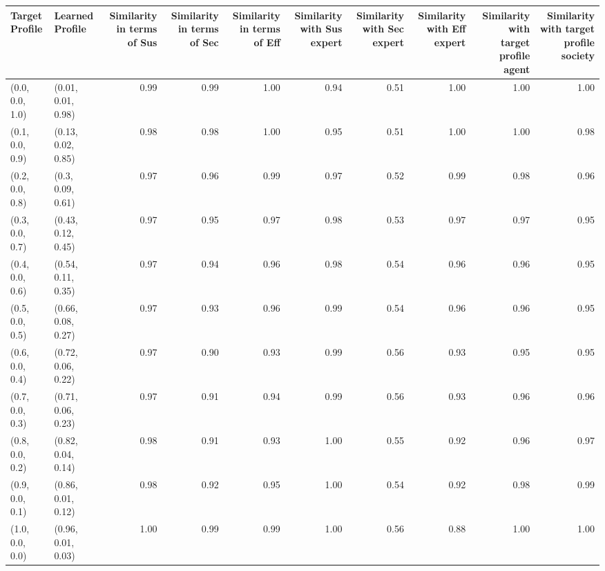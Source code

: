 \begin{tabular}{llrrrrrrrr}
\toprule
Target Profile & Learned Profile & Similarity in terms of Sus & Similarity in terms of Sec & Similarity in terms of Eff & Similarity with Sus expert & Similarity with Sec expert & Similarity with Eff expert & Similarity with target profile agent & Similarity with target profile society \\
\midrule
(0.0, 0.0, 1.0) & (0.01, 0.01, 0.98) & 0.99 & 0.99 & 1.00 & 0.94 & 0.51 & 1.00 & 1.00 & 1.00 \\
(0.1, 0.0, 0.9) & (0.13, 0.02, 0.85) & 0.98 & 0.98 & 1.00 & 0.95 & 0.51 & 1.00 & 1.00 & 0.98 \\
(0.2, 0.0, 0.8) & (0.3, 0.09, 0.61) & 0.97 & 0.96 & 0.99 & 0.97 & 0.52 & 0.99 & 0.98 & 0.96 \\
(0.3, 0.0, 0.7) & (0.43, 0.12, 0.45) & 0.97 & 0.95 & 0.97 & 0.98 & 0.53 & 0.97 & 0.97 & 0.95 \\
(0.4, 0.0, 0.6) & (0.54, 0.11, 0.35) & 0.97 & 0.94 & 0.96 & 0.98 & 0.54 & 0.96 & 0.96 & 0.95 \\
(0.5, 0.0, 0.5) & (0.66, 0.08, 0.27) & 0.97 & 0.93 & 0.96 & 0.99 & 0.54 & 0.96 & 0.96 & 0.95 \\
(0.6, 0.0, 0.4) & (0.72, 0.06, 0.22) & 0.97 & 0.90 & 0.93 & 0.99 & 0.56 & 0.93 & 0.95 & 0.95 \\
(0.7, 0.0, 0.3) & (0.71, 0.06, 0.23) & 0.97 & 0.91 & 0.94 & 0.99 & 0.56 & 0.93 & 0.96 & 0.96 \\
(0.8, 0.0, 0.2) & (0.82, 0.04, 0.14) & 0.98 & 0.91 & 0.93 & 1.00 & 0.55 & 0.92 & 0.96 & 0.97 \\
(0.9, 0.0, 0.1) & (0.86, 0.01, 0.12) & 0.98 & 0.92 & 0.95 & 1.00 & 0.54 & 0.92 & 0.98 & 0.99 \\
(1.0, 0.0, 0.0) & (0.96, 0.01, 0.03) & 1.00 & 0.99 & 0.99 & 1.00 & 0.56 & 0.88 & 1.00 & 1.00 \\
\bottomrule
\end{tabular}
